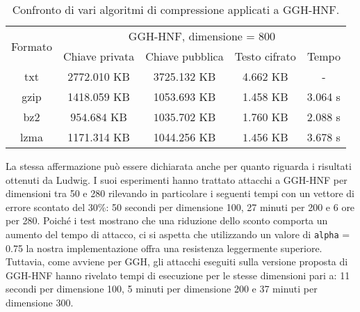 \begin{table}[H]
    \centering
    \begin{tabular}{|c|c|c|c|c|}
    \hline
    \multirow{2}{*}{Formato} & \multicolumn{4}{c|}{GGH-HNF, dimensione = 800}\\ \cline{2-5} 
     & Chiave privata & Chiave pubblica & Testo cifrato & Tempo \\ \hline
    txt & 2772.010 KB& 3725.132 KB& 4.662 KB& - \\ \hline
    gzip & 1418.059 KB& 1053.693 KB& 1.458 KB& 3.064 s\\ \hline
    bz2 & $\mathbf{954.684}$ KB& $\mathbf{1035.702}$ KB& 1.760 KB& $\mathbf{2.088}$ s\\ \hline
    lzma & 1171.314 KB& 1044.256 KB& $\mathbf{1.456}$ KB& 3.678 s\\ \hline
    \end{tabular}
    \caption{Confronto di vari algoritmi di compressione applicati a GGH-HNF.}
    \label{tab:GGHHNF_differenze}

\end{table}

La stessa affermazione può essere dichiarata anche per quanto riguarda i risultati ottenuti
da Ludwig. I suoi esperimenti hanno trattato attacchi a GGH-HNF per dimensioni tra 
50 e 280 rilevando in particolare i seguenti tempi con un vettore di errore scontato
del 30\%: 50 secondi per dimensione 100, 27 minuti per 200 e 6 ore per 280. 
Poiché i test mostrano che una riduzione dello sconto comporta un aumento del tempo di 
attacco, ci si aspetta che utilizzando un valore di \texttt{alpha} = 0.75 la nostra 
implementazione offra una resistenza leggermente superiore. Tuttavia, come avviene per 
GGH, gli attacchi eseguiti sulla versione proposta di GGH-HNF hanno rivelato tempi di 
esecuzione per le stesse dimensioni pari a: 11 secondi per dimensione 100, 5 minuti per 
dimensione 200 e 37 minuti per dimensione 300.